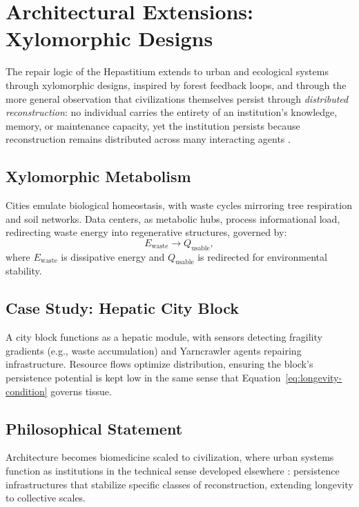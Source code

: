 \documentclass[12pt]{article}
\begin{document}
\section{Architectural Extensions: Xylomorphic Designs}
\label{sec:architecture}

The repair logic of the Hepastitium extends to urban and ecological systems through xylomorphic designs, inspired by forest feedback loops, and through the more general observation that civilizations themselves persist through \emph{distributed reconstruction}: no individual carries the entirety of an institution's knowledge, memory, or maintenance capacity, yet the institution persists because reconstruction remains distributed across many interacting agents \cite{flyxion2026persistence}.

\subsection{Xylomorphic Metabolism}

Cities emulate biological homeostasis, with waste cycles mirroring tree respiration and soil networks. Data centers, as metabolic hubs, process informational load, redirecting waste energy into regenerative structures, governed by:
\begin{equation}
E_{\text{waste}} \to Q_{\text{usable}},
\label{eq:waste-conversion}
\end{equation}
where $E_{\text{waste}}$ is dissipative energy and $Q_{\text{usable}}$ is redirected for environmental stability.

\subsection{Case Study: Hepatic City Block}

A city block functions as a hepatic module, with sensors detecting fragility gradients (e.g., waste accumulation) and Yarncrawler agents repairing infrastructure. Resource flows optimize distribution, ensuring the block's persistence potential is kept low in the same sense that Equation~\eqref{eq:longevity-condition} governs tissue.

\subsection{Philosophical Statement}

Architecture becomes biomedicine scaled to civilization, where urban systems function as institutions in the technical sense developed elsewhere \cite{flyxion2026persistence}: persistence infrastructures that stabilize specific classes of reconstruction, extending longevity to collective scales.
\end{document}
